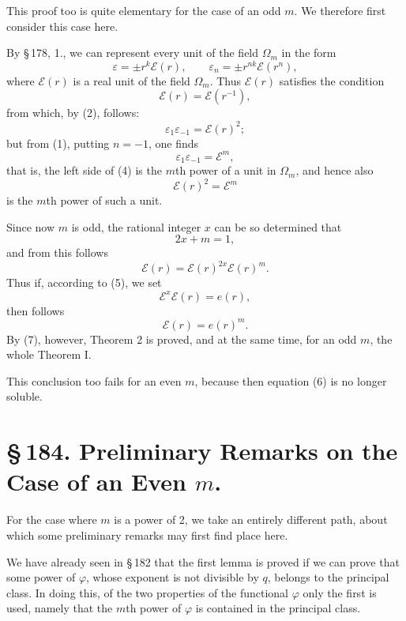 \documentclass[11pt]{article}
\begin{document}
This proof too is quite elementary for the case of an odd $m$. We therefore first consider this case here.

By \S\,178, 1., we can represent every unit of the field $\Omega_m$ in the form
\begin{equation}
\varepsilon=\pm r^k\mathscr E(r),\qquad
\varepsilon_n=\pm r^{nk}\mathscr E(r^n),
\tag{2}
\end{equation}
where $\mathscr E(r)$ is a real unit of the field $\Omega_m$. Thus $\mathscr E(r)$ satisfies the condition
\begin{equation}
\mathscr E(r)=\mathscr E(r^{-1}),
\tag{3}
\end{equation}
from which, by (2), follows:
\begin{equation}
\varepsilon_1\varepsilon_{-1}=\mathscr E(r)^2;
\tag{4}
\end{equation}
but from (1), putting $n=-1$, one finds
\[
\varepsilon_1\varepsilon_{-1}=\mathscr E^m,
\]
that is, the left side of (4) is the $m$th power of a unit in $\Omega_m$, and hence also
\begin{equation}
\mathscr E(r)^2=\mathscr E^m
\tag{5}
\end{equation}
is the $m$th power of such a unit.

Since now $m$ is odd, the rational integer $x$ can be so determined that
\begin{equation}
2x+m=1,
\tag{6}
\end{equation}
and from this follows
\[
\mathscr E(r)=\mathscr E(r)^{2x}\mathscr E(r)^m.
\]
Thus if, according to (5), we set
\[
\mathscr E^x\mathscr E(r)=e(r),
\]
then follows
\begin{equation}
\mathscr E(r)=e(r)^m.
\tag{7}
\end{equation}
By (7), however, Theorem 2 is proved, and at the same time, for an odd $m$, the whole Theorem I.

This conclusion too fails for an even $m$, because then equation (6) is no longer soluble.

\section*{\S\,184. Preliminary Remarks on the Case of an Even $m$.}

For the case where $m$ is a power of 2, we take an entirely different path, about which some preliminary remarks may first find place here.

We have already seen in \S\,182 that the first lemma is proved if we can prove that some power of $\varphi$, whose exponent is not divisible by $q$, belongs to the principal class. In doing this, of the two properties of the functional $\varphi$ only the first is used, namely that the $m$th power of $\varphi$ is contained in the principal class.
\end{document}
